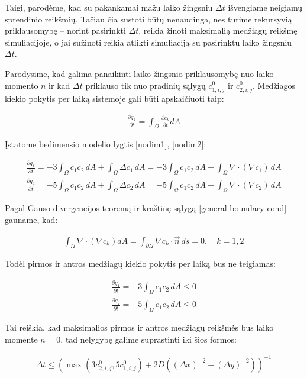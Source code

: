 Taigi, parodėme, kad su pakankamai mažu laiko žingsniu $\Delta t$ išvengiame neigiamų sprendinio reikšmių. Tačiau čia sustoti būtų nenaudinga, nes turime rekursyvią priklausomybę -- norint pasirinkti $\Delta t$, reikia žinoti maksimalią medžiagų reikšmę simuliacijoje, o jai sužinoti reikia atlikti simuliaciją su pasirinktu laiko žingsniu $\Delta t$.

Parodysime, kad galima panaikinti laiko žingsnio priklausomybę nuo laiko momento $n$ ir kad $\Delta t$ priklauso tik nuo pradinių sąlygų $c^0_{1,i,j}$ ir $c^0_{2,i,j}$. Medžiagos kiekio pokytis per laiką sistemoje gali būti apskaičiuoti taip:

\begin{align}
  \frac{\partial q_k}{\partial t} = \int_\Omega \frac{\partial c_k}{\partial t} dA
\end{align}

Įstatome bedimensio modelio lygtis \eqref{nodim1}, \eqref{nodim2}:

\begin{align}
  \frac{\partial q_1}{\partial t}=-3\int_\Omega c_1c_2\,dA + \int_\Omega \Delta c_1\,dA=-3\int_\Omega c_1c_2\,dA + \int_\Omega \nabla \cdot (\nabla c_1)\,dA\\
  \frac{\partial q_2}{\partial t}=-5\int_\Omega c_1c_2\,dA + \int_\Omega \Delta c_2\,dA=-5\int_\Omega c_1c_2\,dA + \int_\Omega \nabla \cdot (\nabla c_2)\,dA
\end{align}

\newpage
Pagal Gauso divergencijos teoremą ir kraštinę sąlygą \eqref{general-boundary-cond} gauname, kad:

\begin{align}
\int_\Omega \nabla \cdot (\nabla c_k) dA = \int_{\partial\Omega} \nabla c_k \cdot \vec{n}\, ds = 0,\quad k=1,2
\end{align}

Todėl pirmos ir antros medžiagų kiekio pokytis per laiką bus ne teigiamas:

\begin{align}
  \frac{\partial q_1}{\partial t}=-3\int_\Omega c_1c_2\,dA \leqslant 0\\
  \frac{\partial q_2}{\partial t}=-5\int_\Omega c_1c_2\,dA\leqslant 0
\end{align}

Tai reiškia, kad maksimalios pirmos ir antros medžiagų reikšmės bus laiko momente $n=0$, tad nelygybę galime suprastinti iki šios formos:

\begin{align}
  \Delta t \leqslant \left(\max(3c^{0}_{2,i,j}, 5c^{0}_{1,i,j})+2D\left((\Delta x)^{-2}+(\Delta y)^{-2}\right)\right)^{-1}
\end{align}

